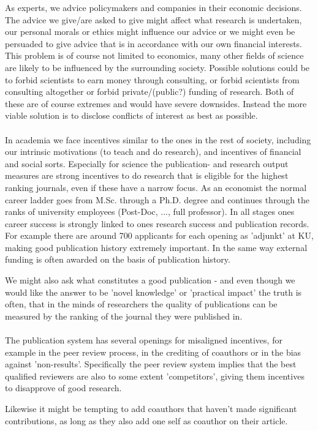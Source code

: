 \documentclass[12pt, a4paper]{article}
\begin{document}
\begin{multicols}{2}
As experts, we advice policymakers and companies in their economic decisions. The advice we give/are asked to give might affect what research is undertaken, our personal morals or ethics might influence our advice or we might even be persuaded to give advice that is in accordance with our own financial interests. This problem is of course not limited to economics, many other fields of science are likely to be influenced by the surrounding society. Possible solutions could be to forbid scientists to earn money through consulting, or forbid scientists from consulting altogether or forbid private/(public?) funding of research. Both of these are of course extremes and would have severe downsides. Instead the more viable solution is to disclose conflicts of interest as best as possible. 
\\ \\
In academia we face incentives similar to the ones in the rest of society, including our intrinsic motivations (to teach and do research), and incentives of financial and social sorts. Especially for science the publication- and research output measures are strong incentives to do research that is eligible for the highest ranking journals, even if these have a narrow focus. As an economist the normal career ladder goes from M.Sc. through a Ph.D. degree and continues through the ranks of university employees (Post-Doc, ..., full professor). In all stages ones career success is strongly linked to ones research success and publication records. For example there are around 700 applicants for each opening as 'adjunkt' at KU, making good publication history extremely important. In the same way external funding is often awarded on the basis of publication history. 

We might also ask what constitutes a good publication - and even though we would like the answer to be 'novel knowledge' or 'practical impact' the truth is often, that in the minds of researchers the quality of publications can be measured by the ranking of the journal they were published in. 
\\ \\ 
The publication system has several openings for misaligned incentives, for example in the peer review process, in the crediting of coauthors or in the bias against 'non-results'. Specifically the peer review system implies that the best qualified reviewers are also to some extent 'competitors', giving them incentives to disapprove of good research. 

Likewise it might be tempting to add coauthors that haven't made significant contributions, as long as they also add one self as coauthor on their article. 



\end{multicols}
\end{document}
